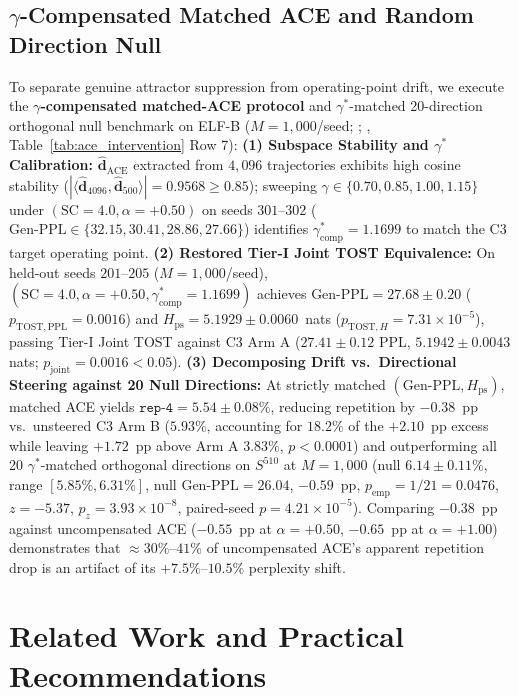 \documentclass[11pt,a4paper]{article}
\begin{document}
\subsection{\texorpdfstring{$\gamma$}{gamma}-Compensated Matched ACE and Random Direction Null}
To separate genuine attractor suppression from operating-point drift, we execute the \textbf{$\gamma$-compensated matched-ACE protocol} and $\gamma^*$-matched 20-direction orthogonal null benchmark on ELF-B ($M=1{,}000$/seed; ; , Table~\ref{tab:ace_intervention} Row 7):
\textbf{(1) Subspace Stability and $\gamma^*$ Calibration:} $\hat{\mathbf{d}}_{\mathrm{ACE}}$ extracted from $4{,}096$ trajectories exhibits high cosine stability ($|\langle \hat{\mathbf{d}}_{4096}, \hat{\mathbf{d}}_{500}\rangle| = 0.9568 \ge 0.85$); sweeping $\gamma \in \{0.70, 0.85, 1.00, 1.15\}$ under $(\text{SC}=4.0, \alpha=+0.50)$ on seeds $301\text{--}302$ ($\text{Gen-PPL} \in \{32.15, 30.41, 28.86, 27.66\}$) identifies $\gamma_{\mathrm{comp}}^* = 1.1699$ to match the C3 target operating point.
\textbf{(2) Restored Tier-I Joint TOST Equivalence:} On held-out seeds $201\text{--}205$ ($M=1{,}000$/seed), $(\text{SC}=4.0, \alpha=+0.50, \gamma_{\mathrm{comp}}^*=1.1699)$ achieves $\text{Gen-PPL} = 27.68\pm 0.20$ ($p_{\mathrm{TOST,PPL}}=0.0016$) and $H_{\mathrm{ps}} = 5.1929\pm 0.0060$~nats ($p_{\mathrm{TOST},H}=7.31\times 10^{-5}$), passing Tier-I Joint TOST against C3 Arm A ($27.41\pm 0.12$ PPL, $5.1942\pm 0.0043$ nats; $p_{\mathrm{joint}}=0.0016 < 0.05$).
\textbf{(3) Decomposing Drift vs.\ Directional Steering against 20 Null Directions:} At strictly matched $(\text{Gen-PPL}, H_{\mathrm{ps}})$, matched ACE yields $\texttt{rep-4} = 5.54\pm 0.08\%$, reducing repetition by $-0.38$~pp vs.\ unsteered C3 Arm B ($5.93\%$, accounting for $18.2\%$ of the $+2.10$~pp excess while leaving $+1.72$~pp above Arm A $3.83\%$, $p < 0.0001$) and outperforming all 20 $\gamma^*$-matched orthogonal directions on $S^{510}$ at $M=1{,}000$ (null $6.14\pm 0.11\%$, range $[5.85\%, 6.31\%]$, null $\text{Gen-PPL}=26.04$, $-0.59$~pp, $p_{\mathrm{emp}} = 1/21 = 0.0476$, $z=-5.37$, $p_z=3.93\times 10^{-8}$, paired-seed $p=4.21\times 10^{-5}$). Comparing $-0.38$~pp against uncompensated ACE ($-0.55$~pp at $\alpha=+0.50$, $-0.65$~pp at $\alpha=+1.00$) demonstrates that $\approx 30\%\text{--}41\%$ of uncompensated ACE's apparent repetition drop is an artifact of its $+7.5\%\text{--}10.5\%$ perplexity shift.

\section{Related Work and Practical Recommendations}
\label{sec:related_work}
\end{document}
